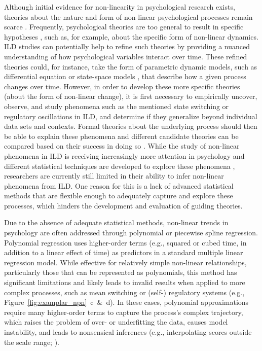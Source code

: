 \documentclass[man, floatsintext]{apa7}
\begin{document}
Although initial evidence for non-linearity in psychological research exists,
theories about the nature and form of non-linear psychological processes remain
scarce \parencite{tan_time-varying_2011}. Frequently, psychological theories
are too general to result in specific hypotheses
\parencite{oberauer_addressing_2019}, such as, for example, about the specific
form of non-linear dynamics. ILD studies can potentially help to refine such
theories by providing a nuanced understanding of how psychological variables
interact over time. These refined theories could, for instance, take the form
of parametric dynamic models, such as differential equation
\parencite{cooper_dynamical_2012} or state-space models
\parencite{durbin_time_2012}, that describe how a given process changes over
time. However, in order to develop these more specific theories (about the form
of non-linear change), it is first necessary to empirically uncover, observe,
and study phenomena such as the mentioned state switching or regulatory
oscillations in ILD, and determine if they generalize beyond individual data
sets and contexts. Formal theories about the underlying process should then be
able to explain these phenomena and different candidate theories can be
compared based on their success in doing so \parencite{borsboom_theory_2021}.
While the study of non-linear phenomena in ILD is receiving increasingly more
attention in psychology and different statistical techniques are developed to
explore these phenomena \parencite{cui_unlocking_2023,humberg_estimating_2024},
researchers are currently still limited in their ability to infer non-linear
phenomena from ILD\@. One reason for this is a lack of advanced statistical
methods that are flexible enough to adequately capture and explore these
processes, which hinders the development and evaluation of guiding theories.

Due to the absence of adequate statistical methods, non-linear trends in
psychology are often addressed through polynomial or piecewise spline
regression. Polynomial regression \parencite{jebb_time_2015} uses higher-order
terms (e.g., squared or cubed time, in addition to a linear effect of time) as
predictors in a standard multiple linear regression model. While effective for
relatively simple non-linear relationships, particularly those that can be
represented as polynomials, this method has significant limitations and likely
leads to invalid results when applied to more complex processes, such as mean
switching or (self-) regulatory systems (e.g.,
Figure~\ref{fig:examplar_npn}~c~\&~d). In these cases, polynomial
approximations require many higher-order terms to capture the process's complex
trajectory, which raises the problem of over- or underfitting the data, causes
model instability, and leads to nonsensical inferences (e.g., interpolating
scores outside the scale range;
\textcite{boyd_divergence_2009,harrell_general_2001,jianan_case_2023}).
\end{document}
